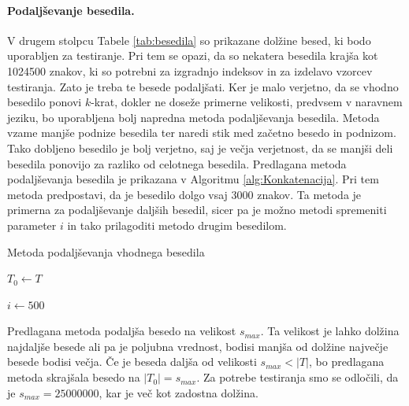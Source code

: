 \paragraph{Podaljševanje besedila.}

V drugem stolpcu Tabele \ref{tab:besedila} so prikazane dolžine besed, ki bodo uporabljen za testiranje. Pri tem se opazi, da so nekatera besedila krajša kot 1024500 znakov, ki so potrebni za izgradnjo indeksov in za izdelavo vzorcev testiranja. Zato je treba te besede podaljšati. Ker je malo verjetno, da se vhodno besedilo ponovi $k$-krat, dokler ne doseže primerne velikosti, predvsem v naravnem jeziku, bo uporabljena bolj napredna metoda podaljševanja besedila. Metoda vzame manjše podnize besedila ter naredi stik med začetno besedo in podnizom. Tako dobljeno besedilo je bolj verjetno, saj je večja verjetnost, da se manjši deli besedila ponovijo za razliko od celotnega besedila. Predlagana metoda podaljševanja besedila je prikazana v Algoritmu \ref{alg:Konkatenacija}. Pri tem metoda predpostavi, da je besedilo dolgo vsaj $3000$ znakov. Ta metoda je primerna za podaljševanje daljših besedil, sicer pa je možno metodi spremeniti parameter $i$ in tako prilagoditi metodo drugim besedilom.


\begin{algorithm}[htb]

\caption{Metoda podaljševanja vhodnega besedila}\label{alg:Konkatenacija}
{
    {$T_0\leftarrow T$}

    {$i\leftarrow 500$}
    
    
}
\end{algorithm}

Predlagana metoda podaljša besedo na velikost $s_{max}$. Ta velikost je lahko dolžina najdaljše besede ali pa je poljubna vrednost, bodisi manjša od dolžine največje besede bodisi večja. Če je beseda daljša od velikosti $s_{max}<|T|$, bo predlagana metoda skrajšala besedo na $|T_0|=s_{max}$. Za potrebe testiranja smo se odločili, da je $s_{max}=25000000$, kar je več kot zadostna dolžina.

